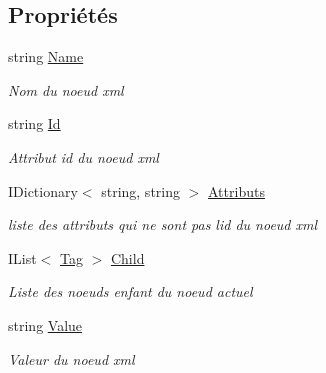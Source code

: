 \subsection*{Propriétés}
\begin{DoxyCompactItemize}
\item 
string \mbox{\hyperlink{class_m_t_connect_agent_1_1_model_1_1_tag_af54ce5d869f1e61c72e39e2437248ac5}{Name}}
\begin{DoxyCompactList}\small\item\em Nom du noeud xml \end{DoxyCompactList}\item 
string \mbox{\hyperlink{class_m_t_connect_agent_1_1_model_1_1_tag_ae16b42aa38a6c939f3679a96dc698ba2}{Id}}
\begin{DoxyCompactList}\small\item\em Attribut id du noeud xml \end{DoxyCompactList}\item 
I\+Dictionary$<$ string, string $>$ \mbox{\hyperlink{class_m_t_connect_agent_1_1_model_1_1_tag_a52005acad928b8e2c84b6dbfbdb2603f}{Attributs}}
\begin{DoxyCompactList}\small\item\em liste des attributs qui ne sont pas l\textquotesingle{}id du noeud xml \end{DoxyCompactList}\item 
I\+List$<$ \mbox{\hyperlink{class_m_t_connect_agent_1_1_model_1_1_tag}{Tag}} $>$ \mbox{\hyperlink{class_m_t_connect_agent_1_1_model_1_1_tag_a4aca782fa5c34818b94fb4c0beceab4b}{Child}}
\begin{DoxyCompactList}\small\item\em Liste des noeuds enfant du noeud actuel \end{DoxyCompactList}\item 
string \mbox{\hyperlink{class_m_t_connect_agent_1_1_model_1_1_tag_a446f4051e2cf01508b20405491b1ca4a}{Value}}
\begin{DoxyCompactList}\small\item\em Valeur du noeud xml \end{DoxyCompactList}\end{DoxyCompactItemize}


